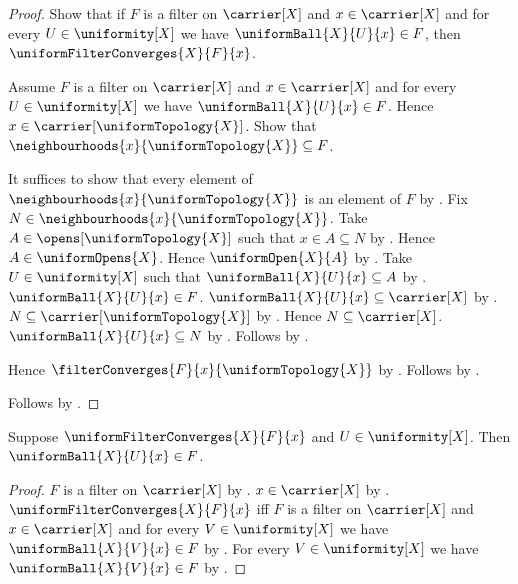 \begin{proof}
    Show that if $F$ is a filter on $\carrier[X]$ and
        $x\in\carrier[X]$ and for every $U\in\uniformity[X]$ we have
        $\uniformBall{X}{U}{x}\in F$, then
            $\uniformFilterConverges{X}{F}{x}$.
    \begin{subproof}
        Assume $F$ is a filter on $\carrier[X]$ and
            $x\in\carrier[X]$ and for every $U\in\uniformity[X]$ we have
            $\uniformBall{X}{U}{x}\in F$.
        Hence $x\in\carrier[\uniformTopology{X}]$.
        Show that $\neighbourhoods{x}{\uniformTopology{X}}\subseteq F$.
        \begin{subproof}
            It suffices to show that every element of
                $\neighbourhoods{x}{\uniformTopology{X}}$ is an element of
                $F$ by .
            Fix $N\in\neighbourhoods{x}{\uniformTopology{X}}$.
            Take $A\in\opens[\uniformTopology{X}]$ such that
                $x\in A\subseteq N$ by .
            Hence $A\in\uniformOpens{X}$.
            Hence $\uniformOpen{X}{A}$ by .
            Take $U\in\uniformity[X]$ such that
                $\uniformBall{X}{U}{x}\subseteq A$
                by .
            $\uniformBall{X}{U}{x}\in F$.
            $\uniformBall{X}{U}{x}\subseteq\carrier[X]$
                by .
            $N\subseteq\carrier[\uniformTopology{X}]$
                by .
            Hence $N\subseteq\carrier[X]$.
            $\uniformBall{X}{U}{x}\subseteq N$
                by .
            Follows by .
        \end{subproof}
        Hence $\filterConverges{F}{x}{\uniformTopology{X}}$
            by .
        Follows by .
    \end{subproof}
    Follows by \auto.
\end{proof}

\begin{proposition}\label{uniform_filter_convergence_entourage}
    Suppose $\uniformFilterConverges{X}{F}{x}$ and $U\in\uniformity[X]$.
    Then $\uniformBall{X}{U}{x}\in F$.
\end{proposition}
\begin{proof}
    $F$ is a filter on $\carrier[X]$ by
        .
    $x\in\carrier[X]$ by .
    $\uniformFilterConverges{X}{F}{x}$ iff
        $F$ is a filter on $\carrier[X]$ and $x\in\carrier[X]$ and for every
            $V\in\uniformity[X]$ we have $\uniformBall{X}{V}{x}\in F$ by
        .
    For every $V\in\uniformity[X]$ we have
        $\uniformBall{X}{V}{x}\in F$ by \auto.
\end{proof}

